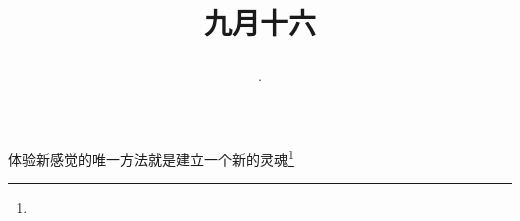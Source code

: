 \title{\date[d=18,m=10,y=2024][year:cn-y,年,month:cn,day:cn,日,·,weekday]·九月十六 }
体验新感觉的唯一方法就是建立一个新的灵魂\footnote{ }

